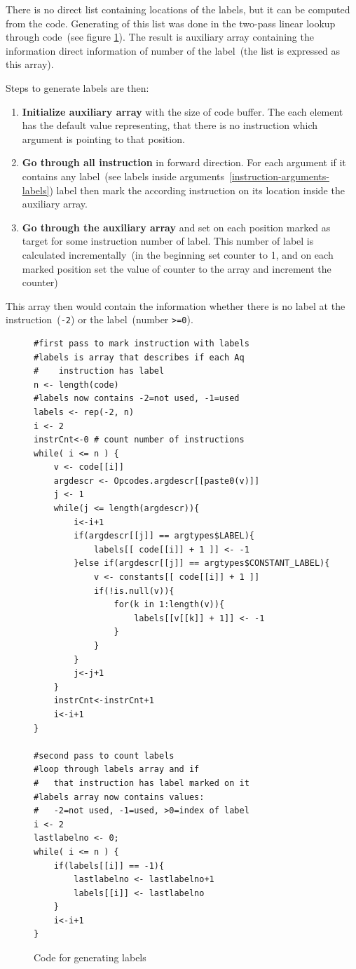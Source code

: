 \documentclass[thesis=M,english]{FITthesis}[2018/10/20]
\newcommand{\code}[1]{\texttt{#1}}
\begin{document}
There is no direct list containing locations of the labels, but it can be computed from the code. Generating of this list was done in the two-pass linear lookup through code~(see figure \ref{fig:code-generating-labels}). The result is auxiliary array containing the information direct information of number of the label~(the list is expressed as this array).

Steps to generate labels are then:
\begin{enumerate}
	\item \textbf{Initialize auxiliary array} with the size of code buffer. The each element has the default value representing, that there is no instruction which argument is pointing to that position.
	\item \textbf{Go through all instruction} in forward direction. For each argument if it contains any label~(see labels inside arguments~\ref{instruction-arguments-labels}) label then mark the according instruction on its location inside the auxiliary array.
	\item \textbf{Go through the auxiliary array} and set on each position marked as target for some instruction number of label. This number of label is calculated incrementally~(in the beginning set counter to 1, and on each marked position set the value of counter to the array and increment the counter)
\end{enumerate}

This array then would contain the information whether there is no label at the instruction~(\code{-2}) or the label~(number \code{>=0}).

\begin{figure}[!h]
\begin{lstlisting}
#first pass to mark instruction with labels
#labels is array that describes if each	Aq
#    instruction has label
n <- length(code)
#labels now contains -2=not used, -1=used
labels <- rep(-2, n)
i <- 2
instrCnt<-0 # count number of instructions
while( i <= n ) {
    v <- code[[i]]
    argdescr <- Opcodes.argdescr[[paste0(v)]]
    j <- 1
    while(j <= length(argdescr)){
        i<-i+1
        if(argdescr[[j]] == argtypes$LABEL){
            labels[[ code[[i]] + 1 ]] <- -1
        }else if(argdescr[[j]] == argtypes$CONSTANT_LABEL){
            v <- constants[[ code[[i]] + 1 ]]
            if(!is.null(v)){
                for(k in 1:length(v)){
                    labels[[v[[k]] + 1]] <- -1
                }
            }
        }
        j<-j+1
    }
    instrCnt<-instrCnt+1
    i<-i+1
}

#second pass to count labels
#loop through labels array and if
#   that instruction has label marked on it
#labels array now contains values:
#   -2=not used, -1=used, >0=index of label
i <- 2
lastlabelno <- 0;
while( i <= n ) {
    if(labels[[i]] == -1){
        lastlabelno <- lastlabelno+1
        labels[[i]] <- lastlabelno
    }
    i<-i+1
}
\end{lstlisting}
	\caption{Code for generating labels}\label{fig:code-generating-labels}
\end{figure}
\end{document}
